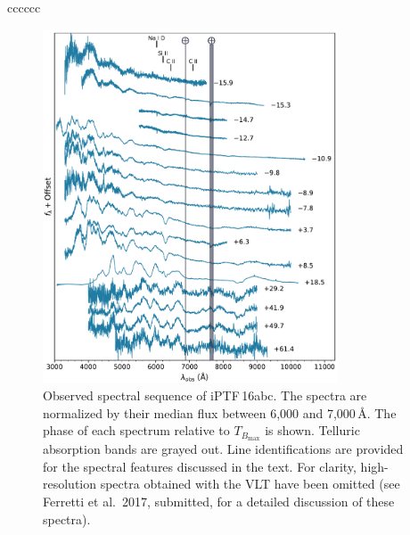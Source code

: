\documentclass[twocolumn]{aastex61}
\newcommand{\abc}{iPTF\,16abc}
\begin{document}
\begin{deluxetable}{cccccc}
  \enddata
\end{deluxetable}

\begin{figure}[!htb]
  \centering
  \includegraphics[width=0.78\textwidth]{spectra.pdf}
  \caption{Observed spectral sequence of \abc. The spectra are 
  normalized by their median flux between 6,000 and 
  7,000$\,\textrm{\AA}$.  The phase of each spectrum 
  relative to $T_{B_\mathrm{max}}$ is shown. Telluric absorption
  bands are grayed out. Line identifications are provided for 
  the spectral features discussed in the text. 
  For clarity, high-resolution spectra obtained with the VLT have been omitted (see Ferretti et al.\ 2017, submitted, for a detailed discussion of these spectra).}
  \label{fig:spec_seq}
\end{figure}
\end{document}
